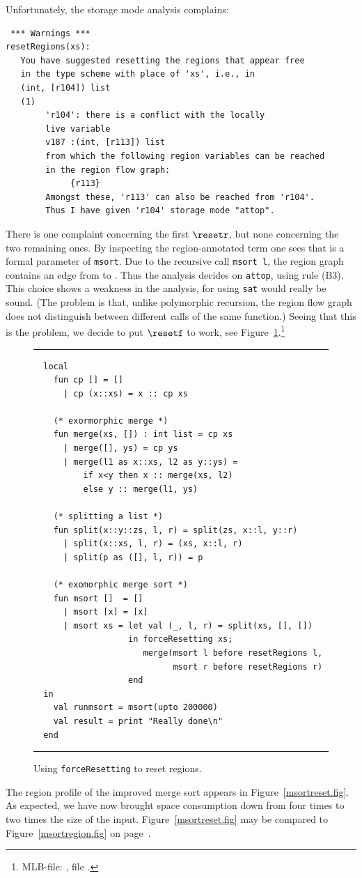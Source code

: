\documentclass[12pt]{book}
\begin{document}
Unfortunately, the storage mode analysis complains:
\begin{verbatim}
 *** Warnings ***
resetRegions(xs):
   You have suggested resetting the regions that appear free
   in the type scheme with place of 'xs', i.e., in
   (int, [r104]) list
   (1)
        'r104': there is a conflict with the locally
        live variable
        v187 :(int, [r113]) list
        from which the following region variables can be reached
        in the region flow graph:
             {r113}
        Amongst these, 'r113' can also be reached from 'r104'.
        Thus I have given 'r104' storage mode "attop".
\end{verbatim}
There is one complaint concerning the first $\resetr$, but none
concerning the two remaining ones.  By inspecting the region-annotated
term one sees that  is a formal parameter of {\tt msort}.
Due to the recursive call {\tt msort l}, the region graph contains an
edge from  to . Thus the analysis decides on
{\tt attop}, using rule (B3). This choice shows a weakness in the
analysis, for using {\tt sat} would really be sound. (The problem is
that, unlike polymorphic recursion, the region flow graph does not
distinguish between different calls of the same function.)  Seeing
that this is the problem, we decide to put $\resetf$ to work, see
Figure~\ref{force.fig}.\footnote{MLB-file:
  , file
  .}
\begin{figure}
\hrule\medskip
\begin{verbatim}
  local
    fun cp [] = []
      | cp (x::xs) = x :: cp xs

    (* exormorphic merge *)
    fun merge(xs, []) : int list = cp xs
      | merge([], ys) = cp ys
      | merge(l1 as x::xs, l2 as y::ys) =
          if x<y then x :: merge(xs, l2)
          else y :: merge(l1, ys)

    (* splitting a list *)
    fun split(x::y::zs, l, r) = split(zs, x::l, y::r)
      | split(x::xs, l, r) = (xs, x::l, r)
      | split(p as ([], l, r)) = p

    (* exomorphic merge sort *)
    fun msort []  = []
      | msort [x] = [x]
      | msort xs = let val (_, l, r) = split(xs, [], [])
                   in forceResetting xs;
                      merge(msort l before resetRegions l,
                            msort r before resetRegions r)
                   end
  in
    val runmsort = msort(upto 200000)
    val result = print "Really done\n"
  end
\end{verbatim}
\caption{Using {\tt forceResetting} to reset regions.}
\medskip
\hrule
\label{force.fig}
\end{figure}
The region profile of the improved merge sort appears in
Figure~\ref{msortreset.fig}. As expected, we have now brought space
consumption down from four times to two times the size of the input.
Figure~\ref{msortreset.fig} may be compared to
Figure~\ref{msortregion.fig} on page~\pageref{msortregion.fig}.
\end{document}
